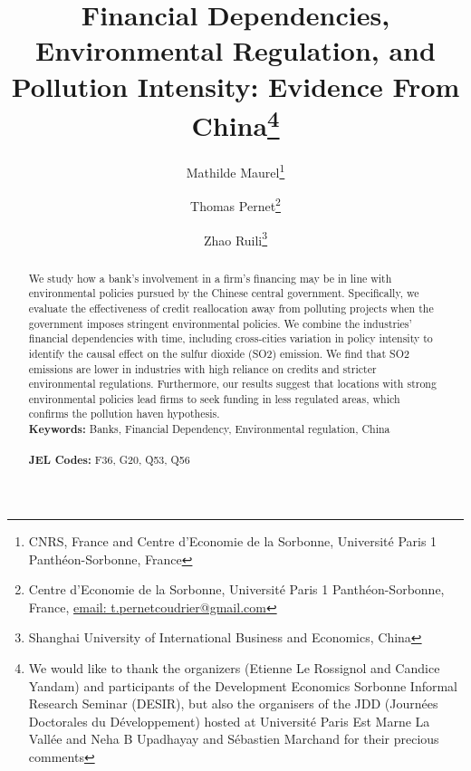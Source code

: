 \documentclass[12pt]{article}
\begin{document}
\begin{titlepage}

\title{Financial Dependencies, Environmental Regulation, and Pollution Intensity: Evidence From China\thanks{We would like to thank the organizers (Etienne Le Rossignol and Candice Yandam) and participants of the Development Economics Sorbonne Informal Research Seminar (DESIR), but also the organisers of the JDD (Journées Doctorales du Développement) hosted at Université Paris Est Marne La Vallée and Neha B Upadhayay and Sébastien Marchand for their precious comments}}
\author{
Mathilde Maurel\thanks{CNRS, France and Centre d'Economie de la Sorbonne, Université Paris 1 Panthéon-Sorbonne, France} 
\and Thomas Pernet\thanks{Centre d'Economie de la Sorbonne, Université Paris 1 Panthéon-Sorbonne, France,
\href{mailto:t.pernetcoudrier@gmail.com}{email: t.pernetcoudrier@gmail.com} 
}
\and Zhao Ruili\thanks{Shanghai University of International Business and Economics, China}
}

\date{}

\maketitle
\begin{abstract}
\noindent We study how a bank’s involvement in a firm's financing may be in line with environmental policies pursued by the Chinese central government. Specifically, we evaluate the effectiveness of credit reallocation away from polluting projects when the government imposes stringent environmental policies. We combine the industries' financial dependencies with time, including cross-cities variation in policy intensity to identify the causal effect on the sulfur dioxide (SO2) emission. We find that SO2 emissions are lower in industries with high reliance on credits and stricter environmental regulations. Furthermore, our results suggest that locations with strong environmental policies lead firms to seek funding in less regulated areas, which confirms the pollution haven hypothesis.
\vspace{0em}\\
\noindent\textbf{Keywords:} Banks, Financial Dependency, Environmental regulation, China\\
\vspace{0em}\\
\noindent\textbf{JEL Codes:} F36, G20, Q53, Q56\\

\bigskip
\end{abstract}
\setcounter{page}{0}
\thispagestyle{empty}
\end{titlepage}
\pagebreak \newpage
\end{document}
